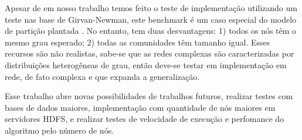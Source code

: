 \documentclass[conference]{IEEEtran}
\begin{document}
Apesar de em nosso trabalho temos feito o teste de implementação utilizando um teste nas base de Girvan-Newman, este benchmark é um caso especial do modelo de partição plantada \cite{b16} . No entanto, tem duas desvantagens: 1) todos os nós têm o mesmo grau esperado; 2) todas as comunidades têm tamanho igual. Esses recursos são não realistas, sabe-se que as redes complexas são caracterizadas por distribuições heterogêneas de grau, então deve-se testar em implementação em rede, de fato complexa e que expanda a generalização.

Esse trabalho abre novas possibilidades de trabalhos futuros, realizar testes com bases de dados maiores, implementação com quantidade de nós maiores em servidores HDFS, e realizar testes de velocidade de execução e perfomance do algoritmo pelo número de nós. 
\end{document}

